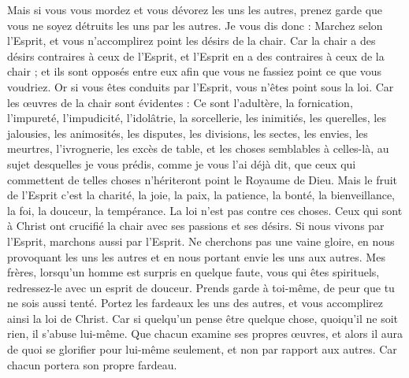 \begin{multicols}{2}
Mais si vous vous mordez et vous dévorez les uns les autres, prenez garde que vous ne soyez détruits les uns par les autres.
Je vous dis donc : Marchez selon l'Esprit, et vous n’accomplirez point les désirs de la chair.
Car la chair a des désirs contraires à ceux de l'Esprit, et l'Esprit en a des contraires à ceux de la chair ; et ils sont opposés entre eux afin que vous ne fassiez point ce que vous voudriez.
Or si vous êtes conduits par l'Esprit, vous n'êtes point sous la loi.
Car les œuvres de la chair sont évidentes : Ce sont l'adultère, la fornication, l’impureté, l'impudicité,
l’idolâtrie, la sorcellerie, les inimitiés, les querelles, les jalousies, les animosités, les disputes, les divisions, les sectes,
les envies, les meurtres, l’ivrognerie, les excès de table, et les choses semblables à celles-là, au sujet desquelles je vous prédis, comme je vous l'ai déjà dit, que ceux qui commettent de telles choses n'hériteront point le Royaume de Dieu.
Mais le fruit de l'Esprit c’est la charité, la joie, la paix, la patience, la bonté, la bienveillance, la foi, la douceur, la tempérance.
La loi n’est pas contre ces choses.
Ceux qui sont à Christ ont crucifié la chair avec ses passions et ses désirs.
Si nous vivons par l'Esprit, marchons aussi par l'Esprit.
Ne cherchons pas une vaine gloire, en nous provoquant les uns les autres et en nous portant envie les uns aux autres.
\VerseOne{}Mes frères, lorsqu'un homme est surpris en quelque faute, vous qui êtes spirituels, redressez-le avec un esprit de douceur. Prends garde à toi-même, de peur que tu ne sois aussi tenté.
Portez les fardeaux les uns des autres, et vous accomplirez ainsi la loi de Christ.
Car si quelqu'un pense être quelque chose, quoiqu'il ne soit rien, il s’abuse lui-même.
Que chacun examine ses propres œuvres, et alors il aura de quoi se glorifier pour lui-même seulement, et non par rapport aux autres.
Car chacun portera son propre fardeau.

\end{multicols}
